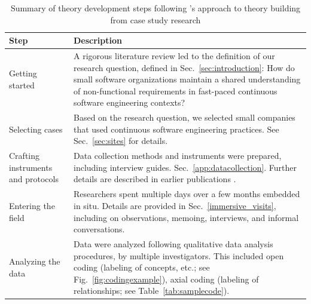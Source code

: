 \documentclass[smallextended]{svjour3}        %
\providecommand{\DIFaddbeginFL}{} %
\providecommand{\DIFdelbeginFL}{} %
\providecommand{\DIFdelendFL}{} %
\newcommand{\DIFscaledelfig}{0.5}
\newlength{\DIFdelgraphicswidth} %
\newlength{\DIFdelgraphicsheight} %
\newcommand{\DIFaddincludegraphics}[2][]{{\color{blue}\fbox{\DIFOincludegraphics[#1]{#2}}}} %
\newcommand{\DIFdelincludegraphics}[2][]{%
\sbox{\DIFdelgraphicsbox}{\DIFOincludegraphics[#1]{#2}}%
\settoboxwidth{\DIFdelgraphicswidth}{\DIFdelgraphicsbox} %
\settoboxtotalheight{\DIFdelgraphicsheight}{\DIFdelgraphicsbox} %
\scalebox{\DIFscaledelfig}{%
\parbox[b]{\DIFdelgraphicswidth}{\usebox{\DIFdelgraphicsbox}\\[-\baselineskip] \rule{\DIFdelgraphicswidth}{0em}}\llap{\resizebox{\DIFdelgraphicswidth}{\DIFdelgraphicsheight}{%
\setlength{\unitlength}{\DIFdelgraphicswidth}%
\begin{picture}(1,1)%
\thicklines\linethickness{2pt} %
{\color[rgb]{1,0,0}\put(0,0){\framebox(1,1){}}}%
{\color[rgb]{1,0,0}\put(0,0){\line( 1,1){1}}}%
{\color[rgb]{1,0,0}\put(0,1){\line(1,-1){1}}}%
\end{picture}%
}\hspace*{3pt}}} %
} %
\DeclareRobustCommand{\DIFaddbeginFL}{\DIFOaddbeginFL \let\includegraphics\DIFaddincludegraphics} %
\DeclareRobustCommand{\DIFdelbeginFL}{\DIFOdelbeginFL \let\includegraphics\DIFdelincludegraphics} %
\DeclareRobustCommand{\DIFdelendFL}{\DIFOaddendFL \let\includegraphics\DIFOincludegraphics} %
\begin{document}
\begin{table}[!h]
    \centering
    \caption{Summary of theory development steps following \citet{eisenhardt1989building}'s approach to theory building from case study research}
    \label{tab:theorizing}

\DIFdelbeginFL %
\DIFdelendFL \DIFaddbeginFL \begin{tabular}{P{2cm}p{9.6cm}}

\toprule 
Step & Description \\
\midrule 

Getting started & A rigorous literature review led to the definition of our research question, defined in Sec.~\ref{sec:introduction}:  How do small software organizations maintain a shared understanding of non-functional requirements in fast-paced continuous software engineering contexts? \\

\addlinespace

Selecting cases & Based on the research question, we selected small companies that used continuous software engineering practices. See Sec.~\ref{sec:sites} for details. \\

\addlinespace

Crafting instruments and protocols & Data collection methods and instruments were prepared, including interview guides. Sec.~\ref{app:datacollection}. Further details are described in earlier publications \citep{werner2020re,werner_tse_2021,okpara_re2022,okpara_rej2023}.\\

\addlinespace

Entering the field & Researchers spent multiple days over a few months embedded in situ. Details are provided in Sec.~\ref{immersive_visits}, including on observations, memoing, interviews, and informal conversations.\\


\addlinespace

Analyzing the data & Data were analyzed following qualitative data analysis procedures, by multiple investigators. This included open coding (labeling of concepts, etc.; see Fig.~\ref{fig:codingexample}), axial coding (labeling of relationships; see Table~\ref{tab:samplecode}). \\


\end{tabular}
\end{table}
\end{document}
